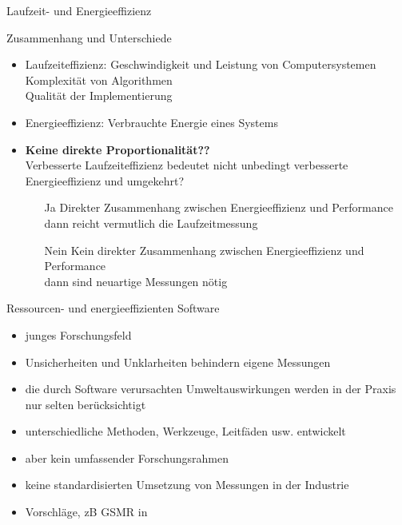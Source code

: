 \begin{frame}{Laufzeit- und Energieeffizienz}

  Zusammenhang und Unterschiede
	    \begin{itemize}
		    \item Laufzeiteffizienz: Geschwindigkeit und Leistung von Computersystemen\\ Komplexität von Algorithmen\\Qualität der Implementierung
        \item Energieeffizienz: Verbrauchte Energie eines Systems \cite{brown_toward_2010}
        \item \textbf<2->{Keine direkte Proportionalität?? }\\
		           Verbesserte Laufzeiteffizienz bedeutet nicht unbedingt verbesserte Energieeffizienz und umgekehrt?
							
							\begin{itemize}
								\item[Ja]  Direkter Zusammenhang zwischen Energieeffizienz und Performance 
								           \cite{pereira_energy_2017,cascaval_folklore_2014,pinto_energy_2017}\\
													  dann reicht vermutlich die Laufzeitmessung
													
								\item[Nein] Kein direkter Zusammenhang zwischen Energieeffizienz und Performance 
								      \cite{trefethen_energy-aware_2013,lima_haskell_2016} \\
											dann sind neuartige Messungen nötig
							\end{itemize}
		\end{itemize}
									
\end{frame}


\begin{frame}{Ressourcen- und energieeffizienten Software \cite{guldner_development_2024}}
\begin{itemize}
	\item junges Forschungsfeld 
	\item Unsicherheiten und Unklarheiten behindern eigene Messungen
	\item die durch Software verursachten Umweltauswirkungen werden in der Praxis nur selten berücksichtigt 
	\item unterschiedliche Methoden, Werkzeuge, Leitfäden usw. entwickelt
	\item  aber kein umfassender Forschungsrahmen
	\item  keine standardisierten Umsetzung von Messungen in der Industrie
	\item Vorschläge, zB  GSMR in \cite{guldner_development_2024}
\end{itemize}				
\end{frame}


